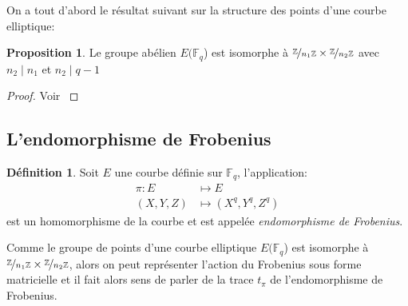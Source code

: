 \documentclass[10pt,a4paper]{book}
\theoremstyle{plain}
\theoremstyle{definition}
\theoremstyle{definition}
\theoremstyle{definition}
\newtheorem{prop}[thm]{Proposition}
\theoremstyle{definition}
\newtheorem{defi}[thm]{Définition}
\theoremstyle{remark}
\theoremstyle{remark}
\begin{document}
On a tout d'abord le résultat suivant sur la structure des points d'une courbe elliptique:
\begin{prop}
Le groupe abélien $E(\mathbb{F}_q$) est isomorphe à $\nicefrac{\mathbb{Z}}{n_1 \mathbb{Z}} \times \nicefrac{\mathbb{Z}}{n_2 \mathbb{Z}}$ avec $n_2 \mid n_1$ et $n_2 \mid q-1$
\end{prop}

\begin{proof}
Voir \cite[Theorem 4.1]{Washington2008}
\end{proof}


\subsection{L'endomorphisme de Frobenius}
\begin{defi}
Soit $E$ une courbe définie sur $\mathbb{F}_q$, l'application: 
\begin{equation*}
\begin{alignedat}{1}
\pi :E &\mapsto  E  \\
 (X,Y,Z)  &\mapsto (X^q,Y^q,Z^q)  
\end{alignedat}
\end{equation*}
est un homomorphisme de la courbe et est appelée \emph{endomorphisme de Frobenius}. 
\end{defi}

Comme le groupe de points d'une courbe elliptique  $E(\mathbb{F}_q$) est isomorphe à $\nicefrac{\mathbb{Z}}{n_1 \mathbb{Z}} \times \nicefrac{\mathbb{Z}}{n_2 \mathbb{Z}}$, alors on peut représenter l'action du Frobenius sous forme matricielle et il fait alors sens de parler de la trace $t_{\pi}$ de l'endomorphisme de Frobenius. 
\end{document}
